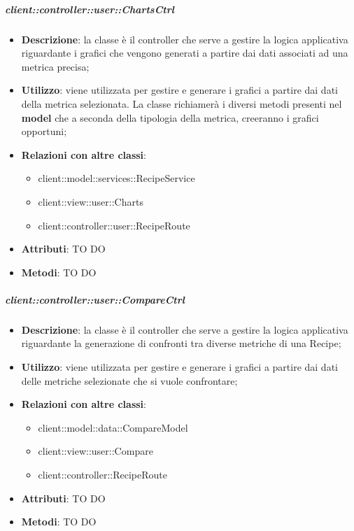 		\subparagraph{client::controller::user::ChartsCtrl} %
		\label{subp:client_controller_user_chartsctrl}
			\begin{itemize}
				\item \textbf{Descrizione}: la classe è il controller che serve a gestire la logica applicativa riguardante i grafici che vengono generati a partire dai dati associati ad una metrica precisa;
				\item \textbf{Utilizzo}: viene utilizzata per gestire e generare i grafici a partire dai dati della metrica selezionata. La classe richiamerà i diversi metodi presenti nel \textbf{model} che a seconda della tipologia della metrica, creeranno i grafici opportuni;
				\item \textbf{Relazioni con altre classi}:
					\begin{itemize}
						\item client::model::services::RecipeService
						\item client::view::user::Charts
						\item client::controller::user::RecipeRoute
					\end{itemize}
				\item \textbf{Attributi}: TO DO
				\item \textbf{Metodi}: TO DO
			\end{itemize}

		\subparagraph{client::controller::user::CompareCtrl} %
		\label{subp:client_controller_user_comparectrl}
			\begin{itemize}
				\item \textbf{Descrizione}: la classe è il controller che serve a gestire la logica applicativa riguardante la generazione di confronti tra diverse metriche di una Recipe;
				\item \textbf{Utilizzo}: viene utilizzata per gestire e generare i grafici a partire dai dati delle metriche selezionate che si vuole confrontare;
				\item \textbf{Relazioni con altre classi}:
					\begin{itemize}
						\item client::model::data::CompareModel
						\item client::view::user::Compare
						\item client::controller::RecipeRoute
					\end{itemize}
				\item \textbf{Attributi}: TO DO
				\item \textbf{Metodi}: TO DO
			\end{itemize}

